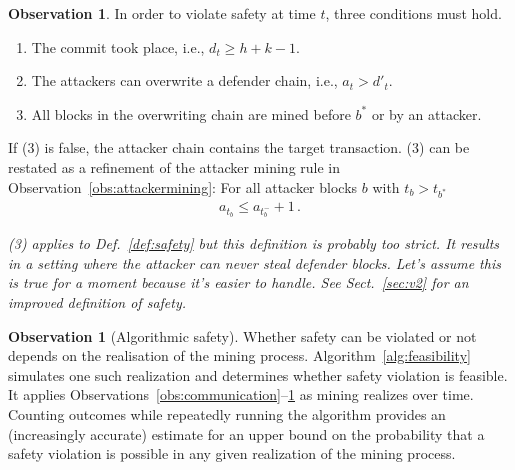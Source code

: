 \documentclass[12pt]{article}
\theoremstyle{definition}
\newtheorem{observation}{Observation}
\newtheorem{simulation}{Observation}
\begin{document}
\begin{observation} \label{obs:feasibility}
  In order to violate safety at time $t$, three conditions must hold.
  \begin{enumerate}
    \item The commit took place, i.e., $d_t \geq h + k - 1$.
    \item The attackers can overwrite a defender chain, i.e., $a_t > d'_t$.
    \item All blocks in the overwriting chain are mined before $b^*$ or by an attacker.
  \end{enumerate}
  If (3) is false, the attacker chain contains the target transaction.
  (3) can be restated as a refinement of the attacker mining rule in Observation~\ref{obs:attackermining}:
  For all attacker blocks $b$ with $t_b > t_{b^*}$
  \begin{align}
    a_{t_b} \leq a_{t_{b}^-} + 1 \,.
  \end{align}

  \emph{
    (3) applies to Def.~\ref{def:safety} but this definition is probably too strict.
    It results in a setting where the attacker can never steal defender blocks.
    Let's assume this is true for a moment because it's easier to handle.
    See Sect.~\ref{sec:v2} for an improved definition of safety.
  }
\end{observation}

\begin{simulation}[Algorithmic safety]
  Whether safety can be violated or not depends on the realisation of the mining process.
  Algorithm~\ref{alg:feasibility} simulates one such realization and determines whether safety violation is feasible.
  It applies Observations~\ref{obs:communication}--\ref{obs:feasibility} as mining realizes over time.
  Counting outcomes while repeatedly running the algorithm provides an (increasingly accurate) estimate for an upper bound on the probability that a safety violation is possible in any given realization of the mining process.
\end{simulation}
\end{document}
